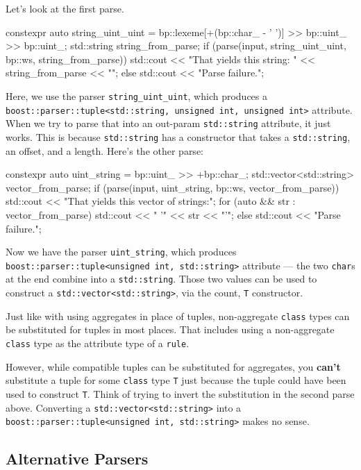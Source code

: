 Let's look at the first parse.

\begin{code}
constexpr auto string_uint_uint =
    bp::lexeme[+(bp::char_ - ' ')] >> bp::uint_ >> bp::uint_;
std::string string_from_parse;
if (parse(input, string_uint_uint, bp::ws, string_from_parse))
    std::cout << "That yields this string: " << string_from_parse << "\n";
else
    std::cout << "Parse failure.\n";
\end{code}

Here, we use the parser \texttt{string\_uint\_uint}, which produces a \texttt{boost::parser::tuple<std::string, unsigned int, unsigned int>} attribute. When we try to parse that into an out-param \texttt{std::string} attribute, it just works. This is because \texttt{std::string} has a constructor that takes a \texttt{std::string}, an offset, and a length. Here's the other parse:

\begin{code}
constexpr auto uint_string = bp::uint_ >> +bp::char_;
std::vector<std::string> vector_from_parse;
if (parse(input, uint_string, bp::ws, vector_from_parse)) {
    std::cout << "That yields this vector of strings:\n";
    for (auto && str : vector_from_parse) {
        std::cout << "  '" << str << "'\n";
    }
} else {
    std::cout << "Parse failure.\n";
}
\end{code}

Now we have the parser \texttt{uint\_string}, which produces \texttt{boost::parser::tuple<unsigned int, std::string>} attribute --- the two \texttt{char}s at the end combine into a \texttt{std::string}. Those two values can be used to construct a \texttt{std::vector<std::string>}, via the count, \texttt{T} constructor.

Just like with using aggregates in place of tuples, non-aggregate \texttt{class} types can be substituted for tuples in most places. That includes using a non-aggregate \texttt{class} type as the attribute type of a \texttt{rule}.

However, while compatible tuples can be substituted for aggregates, you \textbf{can't} substitute a tuple for some \texttt{class} type \texttt{T} just because the tuple could have been used to construct \texttt{T}. Think of trying to invert the substitution in the second parse above. Converting a \texttt{std::vector<std::string>} into a \texttt{boost::parser::tuple<unsigned int, std::string>} makes no sense.

\subsection{Alternative Parsers}

